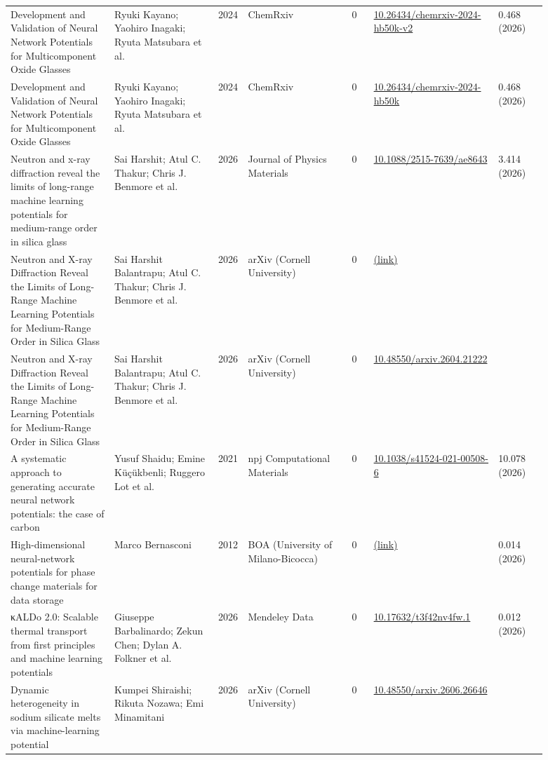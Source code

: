 \documentclass[10pt,a4paper]{article}
\begin{document}
{\begin{longtable}{p{0.192\linewidth}p{0.192\linewidth}p{0.043\linewidth}p{0.192\linewidth}p{0.043\linewidth}p{0.132\linewidth}p{0.096\linewidth}}
Development and Validation of Neural Network Potentials for Multicomponent Oxide Glasses & Ryuki Kayano; Yaohiro Inagaki; Ryuta Matsubara et al. & 2024 & ChemRxiv & 0 & \href{https://doi.org/10.26434/chemrxiv-2024-hb50k-v2}{10.26434/chemrxiv-2024-hb50k-v2} & 0.468 (2026) \\
Development and Validation of Neural Network Potentials for Multicomponent Oxide Glasses & Ryuki Kayano; Yaohiro Inagaki; Ryuta Matsubara et al. & 2024 & ChemRxiv & 0 & \href{https://doi.org/10.26434/chemrxiv-2024-hb50k}{10.26434/chemrxiv-2024-hb50k} & 0.468 (2026) \\
Neutron and x-ray diffraction reveal the limits of long-range machine learning potentials for medium-range order in silica glass & Sai Harshit; Atul C. Thakur; Chris J. Benmore et al. & 2026 & Journal of Physics Materials & 0 & \href{https://doi.org/10.1088/2515-7639/ae8643}{10.1088/2515-7639/ae8643} & 3.414 (2026) \\
Neutron and X-ray Diffraction Reveal the Limits of Long-Range Machine Learning Potentials for Medium-Range Order in Silica Glass & Sai Harshit Balantrapu; Atul C. Thakur; Chris J. Benmore et al. & 2026 & arXiv (Cornell University) & 0 & \href{https://openalex.org/W7155654491}{(link)} &  \\
Neutron and X-ray Diffraction Reveal the Limits of Long-Range Machine Learning Potentials for Medium-Range Order in Silica Glass & Sai Harshit Balantrapu; Atul C. Thakur; Chris J. Benmore et al. & 2026 & arXiv (Cornell University) & 0 & \href{https://doi.org/10.48550/arxiv.2604.21222}{10.48550/arxiv.2604.21222} &  \\
A systematic approach to generating accurate neural network potentials: the case of carbon & Yusuf Shaidu; Emine Küçükbenli; Ruggero Lot et al. & 2021 & npj Computational Materials & 0 & \href{https://doi.org/10.1038/s41524-021-00508-6}{10.1038/s41524-021-00508-6} & 10.078 (2026) \\
High-dimensional neural-network potentials for phase change materials for data storage & Marco Bernasconi & 2012 & BOA (University of Milano-Bicocca) & 0 & \href{https://openalex.org/W2325852788}{(link)} & 0.014 (2026) \\
κALDo 2.0: Scalable thermal transport from first principles and machine learning potentials & Giuseppe Barbalinardo; Zekun Chen; Dylan A. Folkner et al. & 2026 & Mendeley Data & 0 & \href{https://doi.org/10.17632/t3f42nv4fw.1}{10.17632/t3f42nv4fw.1} & 0.012 (2026) \\
Dynamic heterogeneity in sodium silicate melts via machine-learning potential & Kumpei Shiraishi; Rikuta Nozawa; Emi Minamitani & 2026 & arXiv (Cornell University) & 0 & \href{https://doi.org/10.48550/arxiv.2606.26646}{10.48550/arxiv.2606.26646} &  \\

\end{longtable}}
\end{document}
